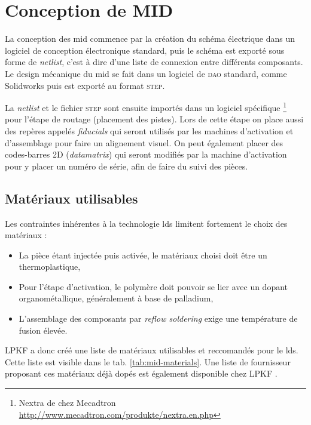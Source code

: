
\section{Conception de MID}
La conception des \gls{mid} commence par la création du schéma électrique dans un logiciel de conception électronique standard, puis le schéma est exporté sous forme de \emph{netlist}, c'est à dire d'une liste de connexion entre différents composants.
Le design mécanique du \gls{mid} se fait dans un logiciel de \textsc{dao} standard, comme Solidworks puis est exporté au format \textsc{step}.

La \emph{netlist} et le fichier \textsc{step} sont ensuite importés dans un logiciel spécifique \footnote{Nextra de chez Mecadtron \url{http://www.mecadtron.com/produkte/nextra.en.php}} pour l'étape de routage (placement des pistes).
Lors de cette étape on place aussi des repères appelés \emph{fiducials} qui seront utilisés par les machines d'activation et d'assemblage pour faire un alignement visuel.
On peut également placer des codes-barres 2D (\emph{datamatrix}) qui seront modifiés par la machine d'activation pour y placer un numéro de série, afin de faire du suivi des pièces.

\subsection{Matériaux utilisables}
Les contraintes inhérentes à la technologie \gls{lds} limitent fortement le choix des matériaux :
\begin{itemize}
    \item La pièce étant injectée puis activée, le matériaux choisi doit être un thermoplastique,
    \item Pour l'étape d'activation, le polymère doit pouvoir se lier avec un dopant organométallique, généralement à base de palladium,
    \item L'assemblage des composants par \textit{reflow soldering} exige une température de fusion élevée.
\end{itemize}

LPKF a donc créé une liste de matériaux utilisables et reccomandés pour le \gls{lds}.
Cette liste est visible dans le tab. \ref{tab:mid-materials}.
Une liste de fournisseur proposant ces matériaux déjà dopés est également disponible chez LPKF \cite{mid-design-rules}.

